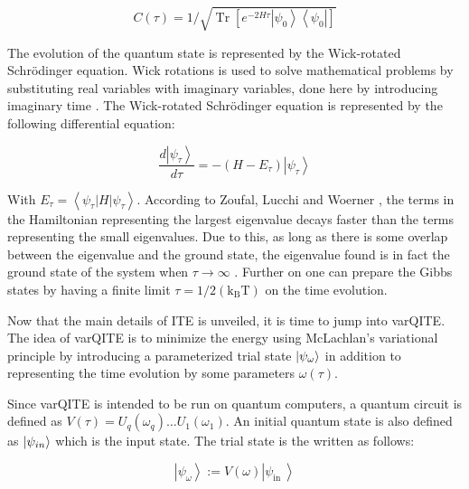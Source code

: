 \documentclass[../main.tex]{subfiles}
\begin{document}
\begin{equation}
C(\tau)=1 / \sqrt{\operatorname{Tr}\left[e^{-2 H \tau}\left|\psi_{0}\right\rangle\left\langle\psi_{0}\right|\right]}
\end{equation}

The evolution of the quantum state is represented by the Wick-rotated Schrödinger equation. Wick rotations is used to solve mathematical problems by substituting real variables with imaginary variables, done here by introducing imaginary time \cite{PhysRev.96.1124}. The Wick-rotated Schrödinger equation is represented by the following differential equation:

\begin{equation}
\frac{d\left|\psi_{\tau}\right\rangle}{d \tau}=-\left(H-E_{\tau}\right)\left|\psi_{\tau}\right\rangle
\label{eq:wick_SE}
\end{equation}

With $E_{\tau}=\left\langle\psi_{\tau}|H| \psi_{\tau}\right\rangle$. According to Zoufal, Lucchi and Woerner \cite{VQB:litteraturelist}, the terms in the Hamiltonian representing the largest eigenvalue decays faster than the terms representing the small eigenvalues. Due to this, as long as there is some overlap between the eigenvalue and the ground state, the eigenvalue found is in fact the ground state of the system when $\tau \rightarrow \infty$ \cite{VQB:litteraturelist}. Further on one can prepare the Gibbs states by having a finite limit $\tau=1 / 2\left(\mathrm{k}_{\mathrm{B}} \mathrm{T}\right)$ on the time evolution.


Now that the main details of ITE is unveiled, it is time to jump into varQITE. The idea of varQITE is to minimize the energy using McLachlan's variational principle \cite{doi:10.1080/00268976400100041} by introducing a parameterized trial state $\ket{\psi_\omega}$ in addition to representing the time evolution by some parameters $\omega(\tau)$.

Since varQITE is intended to be run on quantum computers, a quantum circuit is defined as $V(\tau)=U_q(\omega_q)\hdots U_1(\omega_1)$. An initial quantum state is also defined as $\ket{\psi_{in}}$ which is the input state. The trial state is the written as follows:

\begin{equation}
\left|\psi_{\omega}\right\rangle:=V(\omega)\left|\psi_{\text {in }}\right\rangle
\end{equation}
\end{document}
